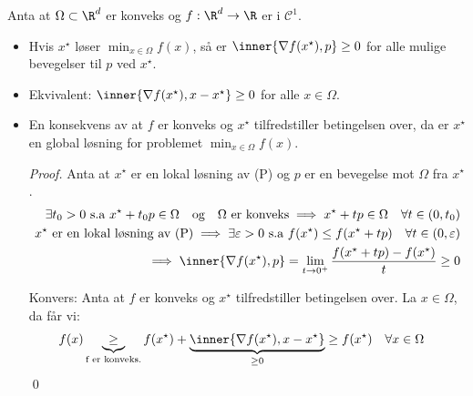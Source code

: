 \begin{proposition}{}{}
	Anta at \(\Omega \subset \R^d\) er konveks og \(f: \R^d \to \R\) er i \(\mathcal{C}^1\).
	\begin{itemize}
		\item Hvis \(x^\star\) løser \(\min_{x \in \Omega} f(x)\), så er \(\inner{\nabla f(x^\star), p} \geq 0\) for alle mulige bevegelser til \(p\) ved \(x^\star\).
		\item Ekvivalent: \(\inner{\nabla f(x^\star), x - x^\star} \geq 0\) for alle \(x \in \Omega\).
		\item En konsekvens av at \(f\) er konveks og \(x^\star\) tilfredstiller betingelsen over, da er \(x^\star\) en global løsning for problemet \(\min_{x \in \Omega} f(x)\).
		      \begin{proof}{}{}
			      Anta at \(x^\star\) er en lokal løsning av (P) og \(p\) er en bevegelse mot \(\Omega\) fra \(x^\star\).
			      \begin{align*}
				      \exists t_0 > 0 \text{ s.a } x^\star + t_0 p \in \Omega \quad \text{og} \quad \Omega \text{ er konveks} \implies x^\star + t p \in \Omega \quad \forall t \in (0, t_0) \\
				      x^\star \text{ er en lokal løsning av (P)} \implies \exists \varepsilon > 0 \text{ s.a } f(x^\star) \leq f(x^\star + t p) \quad \forall t \in (0, \varepsilon)         \\
				      \implies \inner{\nabla f(x^\star), p} = \lim_{t \to 0^+} \frac{f(x^\star + t p) - f(x^\star)}{t} \geq 0                                                                \\
			      \end{align*}

			      Konvers: Anta at \(f\) er konveks og \(x^\star\) tilfredstiller betingelsen over. La \(x \in \Omega\), da får vi:
			      \begin{align*}
				      f(x) & \underbrace{\geq}_{\text{f er konveks.}} f(x^\star) + \underbrace{\inner{\nabla f(x^\star), x - x^\star}}_{\geq 0} \geq f(x^\star) \quad \forall x \in \Omega
			      \end{align*}
			      \qed
		      \end{proof}
	\end{itemize}
\end{proposition}

